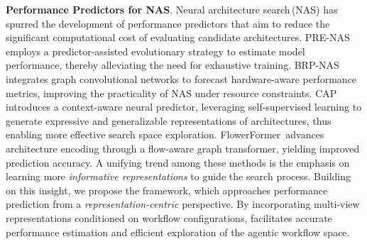 \textbf{Performance Predictors for NAS}. Neural architecture search\,(NAS) has spurred the development of performance predictors that aim to reduce the significant computational cost of evaluating candidate architectures. PRE-NAS\,\citep{PRENAS_GECCO_22} employs a predictor-assisted evolutionary strategy to estimate model performance, thereby alleviating the need for exhaustive training. BRP-NAS\,\citep{BRPNAS_NeurIPS_20} integrates graph convolutional networks to forecast hardware-aware performance metrics, improving the practicality of NAS under resource constraints. CAP\,\citep{CAP_IJCAI_24} introduces a context-aware neural predictor, leveraging self-supervised learning to generate expressive and generalizable representations of architectures, thus enabling more effective search space exploration. FlowerFormer\,\citep{FlowerFormer_CVPR_24} advances architecture encoding through a flow-aware graph transformer, yielding improved prediction accuracy. A unifying trend among these methods is the emphasis on learning more \emph{informative representations} to guide the search process. Building on this insight, we propose the \ours{} framework, which approaches performance prediction from a \emph{representation-centric} perspective. By incorporating multi-view representations conditioned on workflow configurations, \ours{} facilitates accurate performance estimation and efficient exploration of the agentic workflow space. 